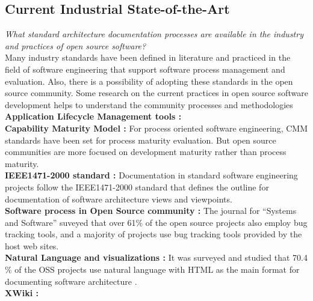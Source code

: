 \subsection{Current Industrial State-of-the-Art}
\indent \emph{What standard architecture documentation processes are available in the industry and practices of open source software?}
\\\indent Many industry standards have been defined in literature and practiced in the field of software engineering that support software process management and evaluation. Also, there is a possibility of adopting these standards in the open source community. Some research on the current practices in open source software development helps to understand the community processes and methodologies
\newline
\\\indent \textbf{Application Lifecycle Management tools : }  
\newline
\\\indent \textbf{Capability Maturity Model : }  For process oriented software engineering, CMM standards \cite{SCAMPITeam2013} have been set for process maturity evaluation. But open source communities are more focused on development maturity rather than process maturity. 
\newline
\\\indent \textbf{IEEE1471-2000 standard : }Documentation in standard software engineering projects follow the IEEE1471-2000 standard \cite{BachmannDocumentingSoftware2010} that defines the outline for documentation of software architecture views and viewpoints.
\newline
\\\indent \textbf{Software process in Open Source community : } The journal for \enquote{Systems and Software} \cite{Zhao2003} suveyed that over 61\% of the open source projects also employ bug tracking tools, and a majority of projects use bug tracking tools provided by the host web sites.
\newline
\\\indent \textbf{Natural Language and visualizations : } It was surveyed and studied that 70.4 \% of the OSS projects use natural language with HTML as the main format for documenting software architecture \cite{6923128}. 
\newline
\\\indent \textbf{XWiki : }

